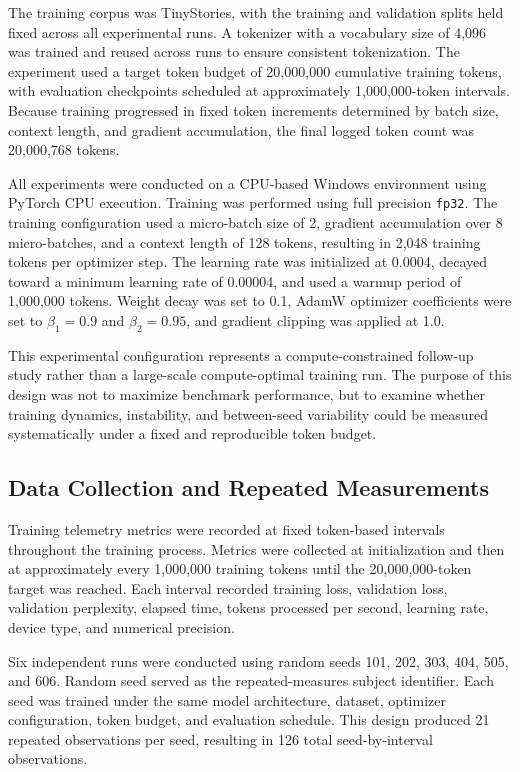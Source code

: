 \documentclass{article}
\begin{document}
The training corpus was TinyStories, with the training and validation splits held fixed across all experimental runs. A tokenizer with a vocabulary size of 4,096 was trained and reused across runs to ensure consistent tokenization. The experiment used a target token budget of 20,000,000 cumulative training tokens, with evaluation checkpoints scheduled at approximately 1,000,000-token intervals. Because training progressed in fixed token increments determined by batch size, context length, and gradient accumulation, the final logged token count was 20,000,768 tokens.

All experiments were conducted on a CPU-based Windows environment using PyTorch CPU execution. Training was performed using full precision \texttt{fp32}. The training configuration used a micro-batch size of 2, gradient accumulation over 8 micro-batches, and a context length of 128 tokens, resulting in 2,048 training tokens per optimizer step. The learning rate was initialized at 0.0004, decayed toward a minimum learning rate of 0.00004, and used a warmup period of 1,000,000 tokens. Weight decay was set to 0.1, AdamW optimizer coefficients were set to $\beta_1 = 0.9$ and $\beta_2 = 0.95$, and gradient clipping was applied at 1.0.

This experimental configuration represents a compute-constrained follow-up study rather than a large-scale compute-optimal training run. The purpose of this design was not to maximize benchmark performance, but to examine whether training dynamics, instability, and between-seed variability could be measured systematically under a fixed and reproducible token budget.

\subsection{Data Collection and Repeated Measurements}

Training telemetry metrics were recorded at fixed token-based intervals throughout the training process. Metrics were collected at initialization and then at approximately every 1,000,000 training tokens until the 20,000,000-token target was reached. Each interval recorded training loss, validation loss, validation perplexity, elapsed time, tokens processed per second, learning rate, device type, and numerical precision.

Six independent runs were conducted using random seeds 101, 202, 303, 404, 505, and 606. Random seed served as the repeated-measures subject identifier. Each seed was trained under the same model architecture, dataset, optimizer configuration, token budget, and evaluation schedule. This design produced 21 repeated observations per seed, resulting in 126 total seed-by-interval observations.
\end{document}
